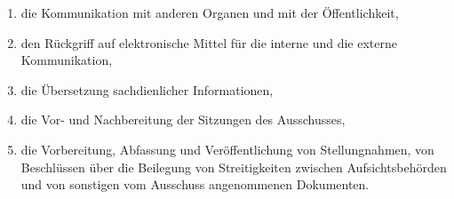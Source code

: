 \begin{enumerate}
\begin{enumerate}
    \item die Kommunikation mit anderen Organen und mit der Öffentlichkeit,
    \label{itm:75-6c}

    \item den Rückgriff auf elektronische Mittel für die interne und die externe Kommunikation,
    \label{itm:75-6d}

    \item die Übersetzung sachdienlicher Informationen,
    \label{itm:75-6e}

    \item die Vor- und Nachbereitung der Sitzungen des Ausschusses,
    \label{itm:75-6f}

    \item die Vorbereitung, Abfassung und Veröffentlichung von Stellungnahmen, von Beschlüssen über die Beilegung von
     Streitigkeiten zwischen Aufsichtsbehörden und von sonstigen vom Ausschuss angenommenen Dokumenten.
    \label{itm:75-6g}

  \end{enumerate}

\end{enumerate}


